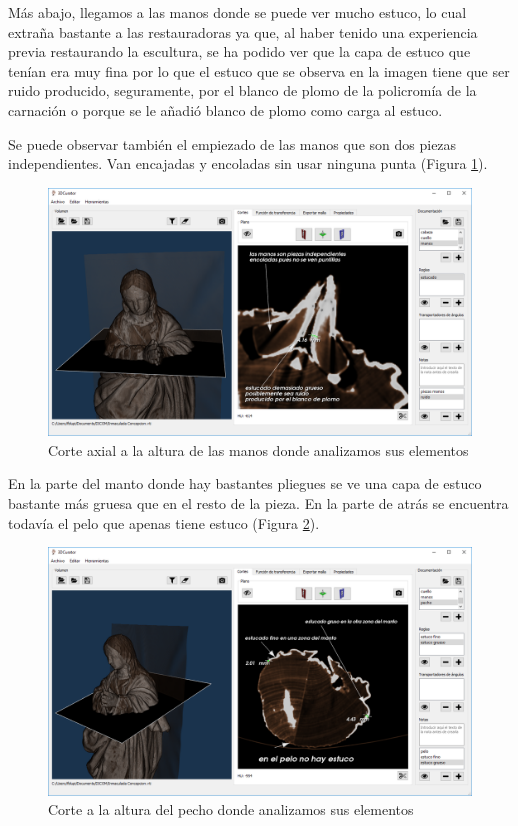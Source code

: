 Más abajo, llegamos a las manos donde se puede ver mucho estuco, lo cual extraña bastante a las restauradoras ya que, al haber tenido una experiencia previa restaurando la escultura, se ha podido ver que la capa de estuco que tenían era muy fina por lo que el estuco que se observa en la imagen tiene que ser ruido producido, seguramente, por el blanco de plomo de la policromía de la carnación o porque se le añadió blanco de plomo como carga al estuco.

Se puede observar también el empiezado de las manos que son dos piezas independientes. Van encajadas y encoladas sin usar ninguna punta (Figura \ref{fig:resultados/documentacion/inmaculada-concepcion/manos}).

\begin{figure}[H]
	\centering
	\includegraphics[width=12.5cm]{imagenes/resultados/documentacion/inmaculada-concepcion/manos}
	\caption{Corte axial a la altura de las manos donde analizamos sus elementos}
	\label{fig:resultados/documentacion/inmaculada-concepcion/manos}
\end{figure}

En la parte del manto donde hay bastantes pliegues se ve una capa de estuco bastante más gruesa que en el resto de la pieza. En la parte de atrás se encuentra todavía el pelo que apenas tiene estuco (Figura \ref{fig:resultados/documentacion/inmaculada-concepcion/pecho}).

\begin{figure}[H]
	\centering
	\includegraphics[width=12.5cm]{imagenes/resultados/documentacion/inmaculada-concepcion/pecho}
	\caption{Corte a la altura del pecho donde analizamos sus elementos}
	\label{fig:resultados/documentacion/inmaculada-concepcion/pecho}
\end{figure}


